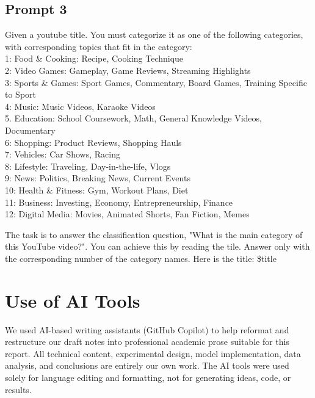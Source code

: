 \documentclass[11pt]{article}
\begin{document}
  \subsection{Prompt 3}\label{prompt-three}
  Given a youtube title. You must categorize it as one of the following categories, with corresponding topics that fit in the category: 
    \\1: Food \& Cooking: Recipe, Cooking Technique
    \\2: Video Games: Gameplay, Game Reviews, Streaming Highlights
    \\3: Sports \& Games: Sport Games, Commentary, Board Games, Training Specific to Sport
    \\4: Music: Music Videos, Karaoke Videos
    \\5. Education: School Coursework, Math, General Knowledge Videos, Documentary
    \\6: Shopping: Product Reviews, Shopping Hauls
    \\7: Vehicles: Car Shows, Racing
    \\8: Lifestyle: Traveling, Day-in-the-life, Vlogs
    \\9: News: Politics, Breaking News, Current Events
    \\10: Health \& Fitness: Gym, Workout Plans, Diet
    \\11: Business: Investing, Economy, Entrepreneurship, Finance
    \\12: Digital Media: Movies, Animated Shorts, Fan Fiction, Memes

    The task is to answer the classification question, "What is the main category of this YouTube video?". You can achieve this by reading the tile.
    Answer only with the corresponding number of the category names.
    Here is the title: \$title

\section*{Use of AI Tools}

We used AI-based writing assistants (GitHub Copilot) to help reformat and restructure our draft notes into professional academic prose suitable for this report. All technical content, experimental design, model implementation, data analysis, and conclusions are entirely our own work. The AI tools were used solely for language editing and formatting, not for generating ideas, code, or results.


\end{document}
